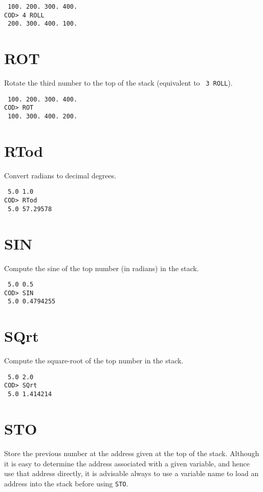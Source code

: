 \medskip
{}
\begin{verbatim}
 100. 200. 300. 400.
COD> 4 ROLL
 200. 300. 400. 100.
\end{verbatim}

\section*{ROT}
Rotate the third number to the top of the stack
(equivalent to \, {\tt 3~ROLL}).

\medskip
{}
\begin{verbatim}
 100. 200. 300. 400.
COD> ROT
 100. 300. 400. 200.
\end{verbatim}

\section*{RTod}
Convert radians to decimal degrees.

\medskip
{}
\begin{verbatim}
 5.0 1.0
COD> RTod
 5.0 57.29578
\end{verbatim}

\section*{SIN}
Compute the sine of the top number (in radians) in the stack.

\medskip
{}
\begin{verbatim}
 5.0 0.5
COD> SIN
 5.0 0.4794255
\end{verbatim}

\section*{SQrt}
Compute the square-root of the top number in the stack.

\medskip
{}
\begin{verbatim}
 5.0 2.0
COD> SQrt
 5.0 1.414214
\end{verbatim}

\section*{STO}
Store the previous number at the address
given at the top of the stack.
Although it is easy to determine the address associated with a given variable,
and hence use that address directly,
it is advisable always to use a variable name
to load an address into the stack before using {\tt STO}.

